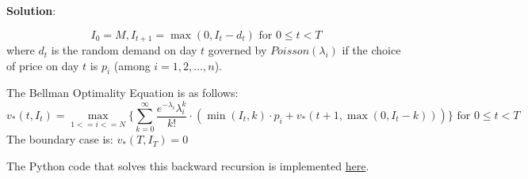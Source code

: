 \documentclass[12pt]{exam}
\begin{document}
\begin{questions}
{\bf Solution}:
 
 $$I_0 = M, I_{t+1} = \max(0, I_t - d_t) \mbox{ for } 0 \leq t < T$$
 where $d_t$ is the random demand on day $t$ governed by $Poisson(\lambda_i)$ if the choice of price on day $t$ is $p_i$ (among $i = 1, 2, \ldots, n$).
 
 The Bellman Optimality Equation is as follows:
 $$v_*(t, I_t) = \max_{1 <= i <= N} \{ \sum_{k=0}^{\infty} \frac {e^{-\lambda_i} \lambda_i^k} {k!} \cdot (\min(I_t, k) \cdot p_i + v_*(t+1, \max(0, I_t - k))) \}\mbox{ for } 0 \leq t < T$$
 The boundary case is: $v_*(T, I_T) = 0$
 
The Python code that solves this backward recursion is implemented \href{https://github.com/coverdrive/MDP-DP-RL/blob/master/src/examples/exam_problems/price_control.py}{here}.

\end{questions}
\end{document}
